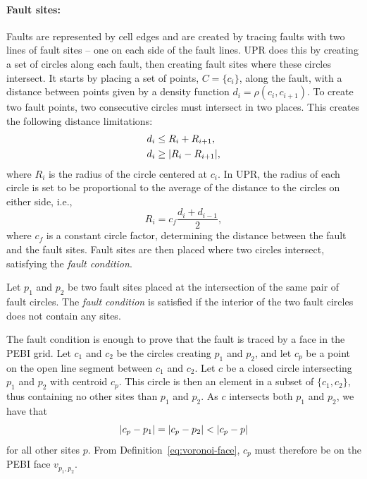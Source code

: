 \paragraph{Fault sites:}
\label{UPR:faults}
Faults are represented by cell edges and are created by tracing faults with two lines of fault sites -- one on each side of the fault lines. UPR does this by creating a set of circles along each fault, then creating fault sites where these circles intersect. It starts by placing a set of points, $C = \{c_i\}$, along the fault, with a distance between points given by a density function $d_i = \rho(c_i, c_{i+1})$. To create two fault points, two consecutive circles must intersect in two places. This creates the following distance limitations:
\begin{align}
    d_i &\le R_i + R_{i+1},  \label{eq:fault_distance_le}\\
    d_i &\ge \lvert R_i - R_{i+1}\rvert,  \label{eq:fault_distance_ge}
\end{align}
where $R_i$ is the radius of the circle centered at $c_i$. In UPR, the radius of each circle is set to be proportional to the average of the distance to the circles on either side, i.e.,
\begin{equation}
    R_i = c_f \frac{d_i + d_{i-1}}{2},
\end{equation}
where $c_f$ is a constant circle factor, determining the distance between the fault and the fault sites. Fault sites are then placed where two circles intersect, satisfying the \emph{fault condition}.

\begin{definition}
\label{def:fault-condition}
Let $p_1$ and $p_2$ be two fault sites placed at the intersection of the same pair of fault circles. The \emph{fault condition} is satisfied if the interior of the two fault circles does not contain any sites.
\end{definition}

The fault condition is enough to prove that the fault is traced by a face in the PEBI grid. Let $c_1$ and $c_2$ be the circles creating $p_1$ and $p_2$, and let $c_p$ be a point on the open line segment between $c_1$ and $c_2$. Let $c$ be a closed circle intersecting $p_1$ and $p_2$ with centroid $c_p$. This circle is then an element in a subset of $\{c_1, c_2\}$, thus containing no other sites than $p_1$ and $p_2$. As $c$ intersects both $p_1$ and $p_2$, we have that
\begin{equation*}
    \lvert c_p - p_1\rvert = \lvert c_p - p_2\rvert < \lvert c_p - p\rvert
\end{equation*}
for all other sites $p$. From Definition~\ref{eq:voronoi-face}, $c_p$ must therefore be on the PEBI face $v_{p_1, p_2}$.


